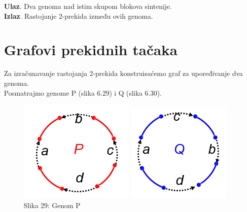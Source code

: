 \textbf{Ulaz}. Dva genoma nad istim skupom blokova
sintenije. \\

\textbf{Izlaz}. Rastojanje 2-prekida između ovih genoma.\\

\newpage
\section{Grafovi prekidnih tačaka}
\indent Za izračunavanje rastojanja 2-prekida konstruisaćemo graf za upoređivanje dva genoma.\\

Posmatrajmo genome {\color{red}P} (slika 6.29) i {\color{blue}Q} (slika 6.30).

\begin{figure}[h!]
  \includegraphics[width=\linewidth]{poglavlja/6/slike/P.PNG}
  \caption{Slika 29: Genom P}
\endminipage\hfill
{}
  \includegraphics[width=\linewidth]{poglavlja/6/slike/Q.PNG}

\end{figure}
